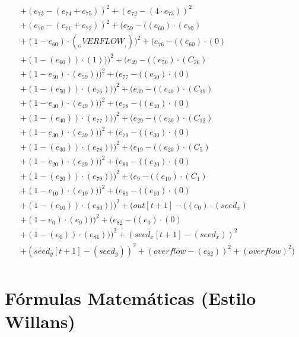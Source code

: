 \documentclass[10pt, a4paper]{article}
\begin{document}
\begin{small}
\begin{align*}
& + (e_{73} - (e_{74} + e_{75}))^{2} + (e_{72} - (4  \cdot  e_{73}))^{2} \\
& + (e_{70} - (e_{71} + e_{72}))^{2} + (e_{59} - ((e_{60})  \cdot  (e_{70}) \\
& + (1 - e_{60})  \cdot  (__OVERFLOW__)))^{2} + (e_{76} - ((e_{60}) \cdot (0) \\
& + (1 - (e_{60})) \cdot (1)))^{2} + (e_{49} - ((e_{50})  \cdot  (C_{26}) \\
& + (1 - e_{50})  \cdot  (e_{59})))^{2} + (e_{77} - ((e_{50}) \cdot (0) \\
& + (1 - (e_{50})) \cdot (e_{76})))^{2} + (e_{39} - ((e_{40})  \cdot  (C_{19}) \\
& + (1 - e_{40})  \cdot  (e_{49})))^{2} + (e_{78} - ((e_{40}) \cdot (0) \\
& + (1 - (e_{40})) \cdot (e_{77})))^{2} + (e_{29} - ((e_{30})  \cdot  (C_{12}) \\
& + (1 - e_{30})  \cdot  (e_{39})))^{2} + (e_{79} - ((e_{30}) \cdot (0) \\
& + (1 - (e_{30})) \cdot (e_{78})))^{2} + (e_{19} - ((e_{20})  \cdot  (C_{5}) \\
& + (1 - e_{20})  \cdot  (e_{29})))^{2} + (e_{80} - ((e_{20}) \cdot (0) \\
& + (1 - (e_{20})) \cdot (e_{79})))^{2} + (e_{9} - ((e_{10})  \cdot  (C_{1}) \\
& + (1 - e_{10})  \cdot  (e_{19})))^{2} + (e_{81} - ((e_{10}) \cdot (0) \\
& + (1 - (e_{10})) \cdot (e_{80})))^{2} + (out[t+1] - ((e_{0})  \cdot  (seed_x) \\
& + (1 - e_{0})  \cdot  (e_{9})))^{2} + (e_{82} - ((e_{0}) \cdot (0) \\
& + (1 - (e_{0})) \cdot (e_{81})))^{2} + (seed_x[t+1] - (seed_x))^{2} \\
& + (seed_y[t+1] - (seed_y))^{2} + (overflow - (e_{82}))^{2} + (overflow)^{2}) \\
\end{align*}
\end{small}\part{Fórmulas Matemáticas (Estilo Willans)}
\end{document}
